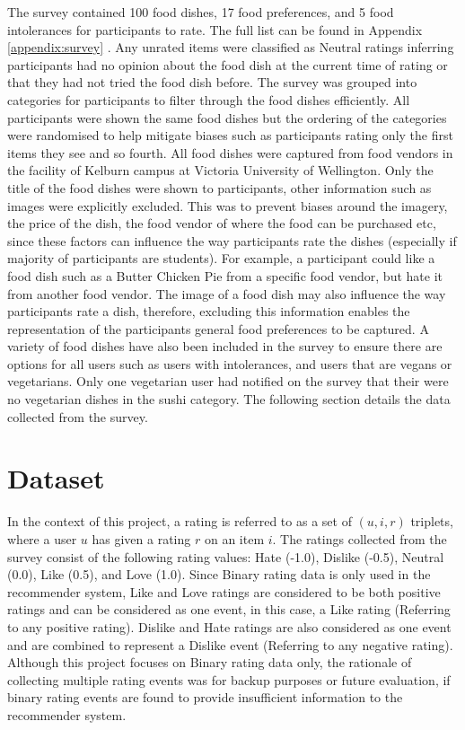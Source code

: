 The survey contained 100 food dishes, 17 food preferences, and 5 food intolerances for participants to rate. The full list can be found in Appendix \ref{appendix:survey} . Any unrated items were classified as Neutral ratings inferring participants had no opinion about the food dish at the current time of rating or that they had not tried the food dish before. The survey was grouped into categories for participants to filter through the food dishes efficiently. All participants were shown the same food dishes but the ordering of the categories were randomised to help mitigate biases such as participants rating only the first items they see and so fourth. All food dishes were captured from food vendors in the facility of Kelburn campus at Victoria University of Wellington. Only the title of the food dishes were shown to participants, other information such as images were explicitly excluded. This was to prevent biases around the imagery, the price of the dish, the food vendor of where the food can be purchased etc, since these factors can influence the way participants rate the dishes (especially if majority of participants are students). For example, a participant could like a food dish such as a Butter Chicken Pie from a specific food vendor, but hate it from another food vendor. The image of a food dish may also influence the way participants rate a dish, therefore, excluding this information enables the representation of the participants general food preferences to be captured. A variety of food dishes have also been included in the survey to ensure there are options for all users such as users with intolerances, and users that are vegans or vegetarians. Only one vegetarian user had notified on the survey that their were no vegetarian dishes in the sushi category. The following section details the data collected from the survey. 

\section{Dataset} \label{dataset}

In the context of this project, a rating is referred to as a set of $(u, i, r)$ triplets, where a user $u$ has given a rating $r$ on an item $i$. 
The ratings collected from the survey consist of the following rating values: Hate (-1.0), Dislike (-0.5), Neutral (0.0), Like (0.5), and Love (1.0). Since Binary rating data is only used in the recommender system, Like and Love ratings are considered to be both positive ratings and can be considered as one event, in this case, a Like rating (Referring to any positive rating). Dislike and Hate ratings are also considered as one event and are combined to represent a Dislike event (Referring to any negative rating). Although this project focuses on Binary rating data only, the rationale of collecting multiple rating events was for backup purposes or future evaluation, if binary rating events are found to provide insufficient information to the recommender system. 

